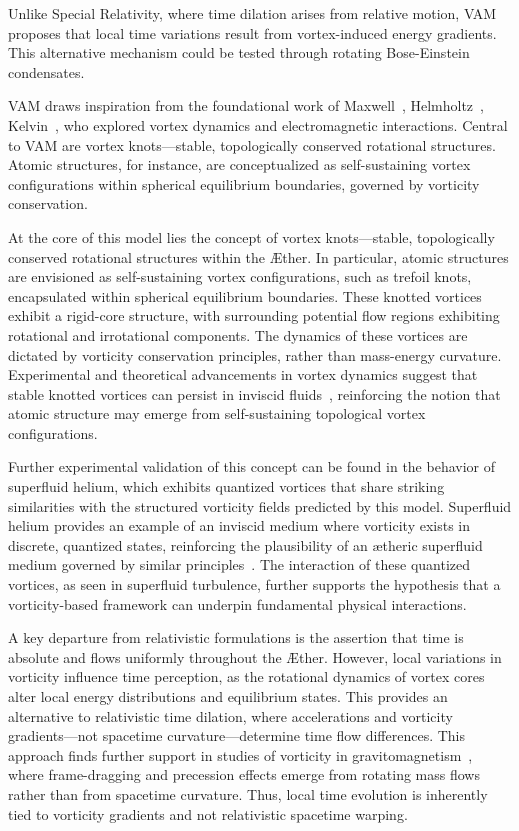 Unlike Special Relativity, where time dilation arises from relative motion, VAM proposes that local time variations result from vortex-induced energy gradients. This alternative mechanism could be tested through rotating Bose-Einstein condensates.

VAM draws inspiration from the foundational work of Maxwell~\cite{maxwell1861}, Helmholtz~\cite{helmholtz1858}, Kelvin~\cite{kelvin1867}, who explored vortex dynamics and electromagnetic interactions. Central to VAM are vortex knots—stable, topologically conserved rotational structures. Atomic structures, for instance, are conceptualized as self-sustaining vortex configurations within spherical equilibrium boundaries, governed by vorticity conservation.

At the core of this model lies the concept of vortex knots—stable, topologically conserved rotational structures within the Æther. In particular, atomic structures are envisioned as self-sustaining vortex configurations, such as trefoil knots, encapsulated within spherical equilibrium boundaries. These knotted vortices exhibit a rigid-core structure, with surrounding potential flow regions exhibiting rotational and irrotational components. The dynamics of these vortices are dictated by vorticity conservation principles, rather than mass-energy curvature. Experimental and theoretical advancements in vortex dynamics suggest that stable knotted vortices can persist in inviscid fluids~\cite{kleckner2013}, reinforcing the notion that atomic structure may emerge from self-sustaining topological vortex configurations.

Further experimental validation of this concept can be found in the behavior of superfluid helium, which exhibits quantized vortices that share striking similarities with the structured vorticity fields predicted by this model. Superfluid helium provides an example of an inviscid medium where vorticity exists in discrete, quantized states, reinforcing the plausibility of an ætheric superfluid medium governed by similar principles~\cite{vinen2002}. The interaction of these quantized vortices, as seen in superfluid turbulence, further supports the hypothesis that a vorticity-based framework can underpin fundamental physical interactions.

A key departure from relativistic formulations is the assertion that time is absolute and flows uniformly throughout the Æther. However, local variations in vorticity influence time perception, as the rotational dynamics of vortex cores alter local energy distributions and equilibrium states. This provides an alternative to relativistic time dilation, where accelerations and vorticity gradients—not spacetime curvature—determine time flow differences. This approach finds further support in studies of vorticity in gravitomagnetism~\cite{cahill2005}, where frame-dragging and precession effects emerge from rotating mass flows rather than from spacetime curvature. Thus, local time evolution is inherently tied to vorticity gradients and not relativistic spacetime warping.

